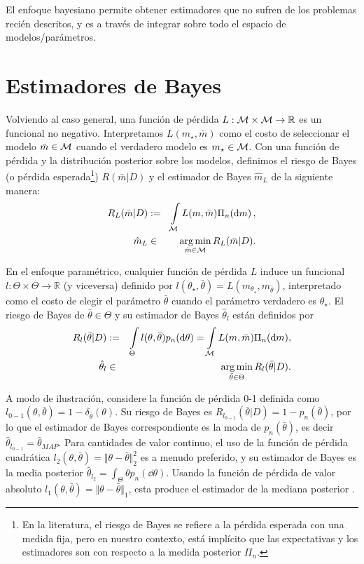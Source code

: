 El enfoque bayesiano permite obtener estimadores que no sufren de los problemas recién descritos, y es a través de integrar sobre todo el espacio de modelos/parámetros.

\section{Estimadores de Bayes}
\label{sec bayes estimators}

Volviendo al caso general, una función de pérdida \(L:\mathcal{M} \times \mathcal{M} \to \mathbb{R}\) es un funcional no negativo. Interpretamos \(L(m_\star, \bar{m})\) como el costo de seleccionar el modelo \(\bar{m} \in \mathcal{M}\) cuando el verdadero modelo es \(m_\star \in \mathcal{M}\). Con una función de pérdida y la distribución posterior sobre los modelos, definimos el riesgo de Bayes (o pérdida esperada\footnote{En la literatura, el riesgo de Bayes se refiere a la pérdida esperada con una medida fija, pero en nuestro contexto, está implícito que las expectativas y los estimadores son con respecto a la medida posterior \(\Pi_n\).}) \(R(\bar{m}|D)\) y el estimador de Bayes \(\hat{m}_L\) de la siguiente manera:
\begin{eqnarray}
	\label{eq hat m abstract}
	R_L(\bar{m}|D) &:=&  \int\limits_{\mathcal{M}} L(m,\bar{m})\Pi_n(\dd m) \, ,\\
	\hat{m}_L &\in&\textstyle \operatorname*{\arg\min}\limits_{\bar{m} \in \mathcal{M}} R_L(\bar{m}|D). 
\end{eqnarray}

En el enfoque paramétrico, cualquier función de pérdida \(L\) induce un funcional \(l : \Theta \times \Theta \to \mathbb{R}\) (y viceversa) definido por
\(l(\theta_\star,\bar{\theta}) = L (m_{\theta_\star}, m_{\bar{\theta}})\), interpretado como el costo de elegir el parámetro \(\bar{\theta}\) cuando el parámetro verdadero es \(\theta_\star\). El riesgo de Bayes \cite{berger2013statistical} de \(\bar{\theta} \in \Theta\) y su estimador de Bayes \(\hat{\theta}_{l}\) están definidos por
\begin{eqnarray}
	\label{eq:param_bayes_risk}
	\textstyle R_{l} (\bar{\theta}|D) &:=& \int\limits_{\Theta} l (\theta ,\bar{\theta})p_n(\dd\theta)=  \int\limits_{\mathcal{M}} L(m,\bar{m})\Pi_n(\dd m),\\
	\hat{\theta}_{l} &\in&\operatorname*{\arg\min}_{\bar{\theta} \in \Theta }R_{l}(\bar{\theta}|D).
\end{eqnarray}

A modo de ilustración, considere la función de pérdida 0-1 definida como \(l_{0-1}(\theta ,\bar{\theta}) = 1-\delta_{\bar{\theta}}(\theta)\). Su riesgo de Bayes es \(R_{l_{0-1}}(\bar{\theta}|D) = 1-p_n(\bar{\theta})\), por lo que el estimador de Bayes correspondiente es la moda de \(p_n(\bar{\theta})\), es decir \(\hat{\theta}_{l_{0-1}} = \hat{\theta}_{MAP}\). Para cantidades de valor continuo, el uso de la función de pérdida cuadrática \(l_{2}( \theta ,\bar{\theta}) =\Vert \theta -\bar{\theta}\Vert_{2}^{2}\) es a menudo preferido, y su estimador de Bayes es la media posterior \(\hat{\theta}_{l_{2}}=\int_{\Theta }\theta p_n(\dd\theta)\). Usando la función de pérdida de valor absoluto \(l_{1}( \theta ,\bar{\theta}) =\Vert \theta -\bar{\theta}\Vert_{1}\), esta produce el estimador de la mediana posterior \cite{stroock2010probability} .


